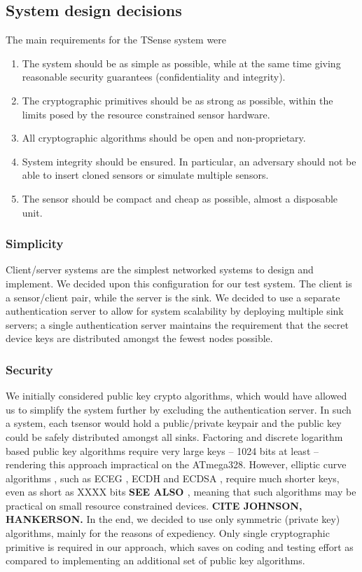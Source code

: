 \subsection{System design decisions}

The main requirements for the TSense system were
%
\begin{enumerate}
\item The system should be as simple as possible, while at the same time giving reasonable security guarantees (confidentiality and integrity).
\item The cryptographic primitives should be as strong as possible, within the limits posed by the resource constrained sensor hardware.
\item All cryptographic algorithms should be open and non-proprietary.
\item System integrity should be ensured. In particular, an adversary should not be able to insert cloned sensors or simulate multiple sensors. 
\item The sensor should be compact and cheap as possible, almost a disposable unit. 
\end{enumerate}

\subsubsection{Simplicity}

Client/server systems are the simplest networked systems to design and implement. We decided upon this configuration for our test system. The client is a sensor/client pair, while the server is the sink. We decided to use a separate authentication server to allow for system scalability by deploying multiple sink servers; a single authentication server maintains the requirement that the secret device keys are distributed amongst the fewest nodes possible.

\subsubsection{Security}

We initially considered public key crypto algorithms, which would have allowed us to simplify the system further by excluding the authentication server. In such a system, each tsensor would hold a public/private keypair and the public key could be safely distributed amongst all sinks. Factoring and discrete logarithm based public key algorithms require very large keys -- 1024 bits at least -- rendering this approach impractical on the ATmega328. However, elliptic curve algorithms \cite{menezes1995,ieee-1363-2000}, such as ECEG \cite{}, ECDH \cite{} and ECDSA \cite{johnson2001a}, require much shorter keys, even as short as XXXX bits \cite{} \textbf{SEE ALSO \cite{NIST-recommended-elliptic-curves-1999}}, meaning that such algorithms may be practical on small resource constrained devices.  \textbf{CITE JOHNSON, HANKERSON.}
%
In the end, we decided to use only symmetric (private key) algorithms, mainly for the reasons of expediency. Only single cryptographic primitive is required in our approach, which saves on coding and testing effort as compared to implementing an additional set of public key algorithms.

